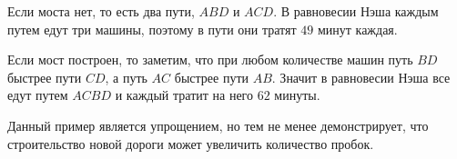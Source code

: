 \begin{solution}
Если моста нет, то есть два пути, $ABD$ и $ACD$. В равновесии Нэша каждым путем едут три машины, поэтому в пути они тратят $49$ минут каждая.

Если мост построен, то заметим, что при любом количестве машин путь $BD$ быстрее пути $CD$, а путь $AC$ быстрее пути $AB$. Значит в равновесии Нэша все едут путем $ACBD$ и каждый тратит на него $62$ минуты.

Данный пример является упрощением, но тем не менее демонстрирует, что строительство новой дороги может увеличить количество пробок.
\end{solution}






